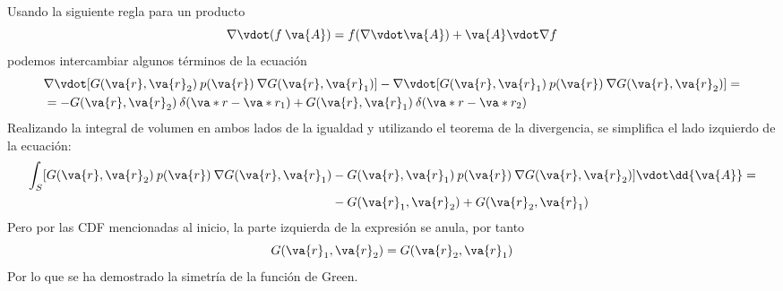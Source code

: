 Usando la siguiente regla para un producto
\begin{equation}
\nabla \vdot (f \: \va{A}) =  f (\nabla \vdot \va{A}) +  \va{A} \vdot \nabla f
\label{eq:ecuacion_23}
\end{equation}
podemos intercambiar algunos términos de la ecuación
\begin{align}
&\nabla \vdot [G(\va{r}, \va{r}_{2}) \: p(\va{r}) \: \nabla G(\va{r}, \va{r}_{1})] - \nabla \vdot [G(\va{r}, \va{r}_{1}) \: p(\va{r}) \: \nabla G(\va{r}, \va{r}_{2})] = \label{eq:ecuacion_24} \\ 
&= - G(\va{r}, \va{r}_{2}) \: \delta(\va*{r} - \va*{r}_{1}) + G(\va{r}, \va{r}_{1}) \: \delta(\va*{r} - \va*{r}_{2}) \label{eq:ecuacion_26}
\end{align}
Realizando la integral de volumen en ambos lados de la igualdad y utilizando el teorema de la divergencia, se simplifica el lado izquierdo de la ecuación:
\begin{align}
\int_{S} [G(\va{r}, \va{r}_{2}) \: p(\va{r}) \: \nabla G(\va{r}, \va{r}_{1}) &- G(\va{r}, \va{r}_{1}) \: p(\va{r}) \: \nabla G(\va{r}, \va{r}_{2}) ] \vdot \dd{\va{A}} = \label{eq:ecuacion_27} \\
&- G(\va{r}_{1}, \va{r}_{2}) + G(\va{r}_{2}, \va{r}_{1}) \label{eq:ecuacion_29}
\end{align}
Pero por las CDF mencionadas al inicio, la parte izquierda de la expresión se anula, por tanto
\begin{equation}
G(\va{r}_{1}, \va{r}_{2}) = G(\va{r}_{2}, \va{r}_{1})
\label{eq:ecuacion_30}
\end{equation}
Por lo que se ha demostrado la simetría de la función de Green.
